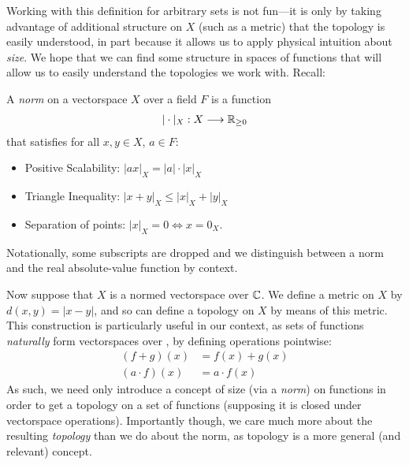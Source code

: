       Working with this definition for arbitrary sets is not fun---it is only by taking advantage of additional structure on $X$ (such as a metric) that the topology is easily understood, in part because it allows us to apply physical intuition about \emph{size}. 
      We hope that we can find some structure in spaces of functions that will allow us to easily understand the topologies we work with.
      Recall:
      \begin{defn}
        A \emph{norm} on a vectorspace $X$ over a field $F$ is a function
        \begin{align*}
          |\cdot|_X:X\longrightarrow\mathbb{R}_{\ge0}
        \end{align*}
        that satisfies for all $x,y\in X$, $a\in F$:
        \begin{itemize}
          \item Positive Scalability: $|ax|_X=|a|\cdot|x|_X$
          \item Triangle Inequality: $|x+y|_X\le|x|_X+|y|_X$
          \item Separation of points: $|x|_X=0\Longleftrightarrow x=0_X$.
        \end{itemize}
        Notationally, some subscripts are dropped and we distinguish between a norm and the real absolute-value function by context.
      \end{defn}

      Now suppose that $X$ is a normed vectorspace over $\mathbb{C}$.
      We define a metric on $X$ by $d(x,y)=|x-y|$, and so can define a topology on $X$ by means of this metric.
      This construction is particularly useful in our context, as sets of functions \emph{naturally} form vectorspaces over \C, by defining operations pointwise:
      \begin{align*}
        (f+g)(x) &= f(x)+g(x)\\
        (a\cdot f)(x) &= a\cdot f(x)
      \end{align*}
      As such, we need only introduce a concept of size (via a \emph{norm}) on functions in order to get a topology on a set of functions (supposing it is closed under vectorspace operations).
      Importantly though, we care much more about the resulting \emph{topology} than we do about the norm, as topology is a more general (and relevant) concept.

